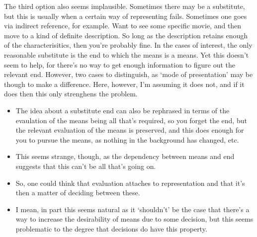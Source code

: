 \documentclass[10pt]{article}
\begin{document}
The third option also seems implausible.
Sometimes there may be a substitute, but this is usually when a certain way of representing fails.
Sometimes one goes via indirect reference, for example.
Want to see some specific movie, and then move to a kind of definite description.
So long as the description retains enough of the characterisitics, then you're probably fine.
In the cases of interest, the only reasonable substitute is the end to which the means is a means.
Yet this doesn't seem to help, for there's no way to get enough information to figure out the relevant end.
However, two cases to distinguish, as `mode of presentation' may be though to make a difference.
Here, however, I'm assuming it does not, and if it does then this only strenghens the problem.
\begin{itemize}
\item The idea about a substitute end can also be rephrased in terms of the evaulation of the means being all that's required, so you forget the end, but the relevant evaluation of the means is preserved, and this does enough for you to pursue the means, as nothing in the background has changed, etc.
\item This seems strange, though, as the dependency between means and end suggests that this can't be all that's going on.
\item So, one could think that evaluation attaches to representation and that it's then a matter of deciding between these.
\item I mean, in part this seems natural as it `shouldn't' be the case that there's a way to increase the desirability of means due to some decision, but this seems problematic to the degree that decisions do have this property.
\end{itemize}
\end{document}
